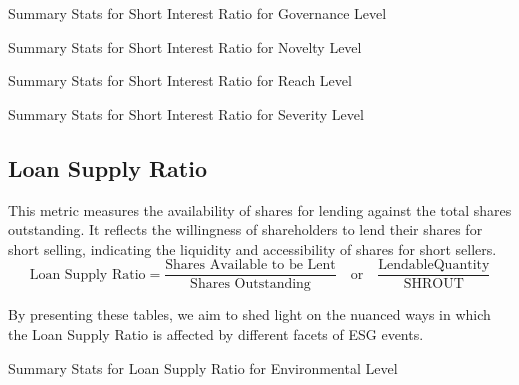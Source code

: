 \begin{table}[H]
\caption{Summary Stats for Short Interest Ratio for Governance Level}
\centering

\label{table:short_interest_ratio_governance.tex}
\end{table}


\begin{table}[H]
\caption{Summary Stats for Short Interest Ratio for Novelty Level}
\centering

\label{table:short_interest_ratio_novelty.tex}
\end{table}

\begin{table}[H]
\caption{Summary Stats for Short Interest Ratio for Reach Level}
\centering

\label{table:short_interest_ratio_reach.tex}
\end{table}

\begin{table}[H]
\caption{Summary Stats for Short Interest Ratio for Severity Level}
\centering

\label{table:short_interest_ratio_severity.tex}
\end{table}


\subsection{Loan Supply Ratio}


This metric measures the availability of shares for lending against the total shares outstanding. It reflects the willingness of shareholders to lend their shares for short selling, indicating the liquidity and accessibility of shares for short sellers.
 \begin{equation}
	\text{Loan Supply Ratio} = \frac{\text{Shares Available to be Lent}}{\text{Shares Outstanding}} \quad \text{or} \quad \frac{\text{LendableQuantity}}{\text{SHROUT}}
	\label{eq:Loan_Supply_Ratio}
\end{equation}

By presenting these tables, we aim to shed light on the nuanced ways in which the Loan Supply Ratio is affected by different facets of ESG events.

\begin{table}[H]
\caption{Summary Stats for Loan Supply Ratio for Environmental Level}
\centering

\label{table:loan_supply_ratio_environment.tex}
\end{table}

